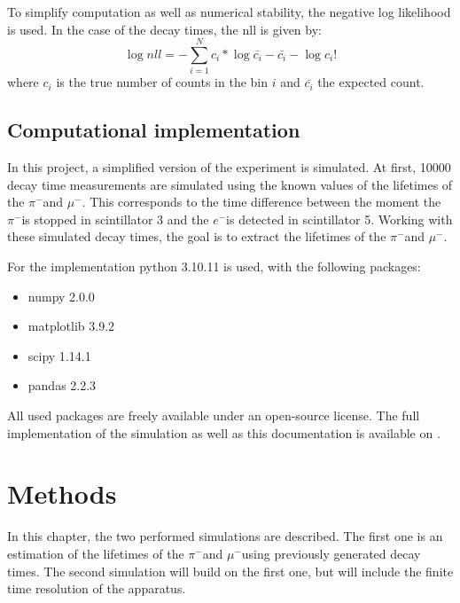 \documentclass[11pt, a4paper, oneside]{book}
\newcommand{\electron}{$e^{-}$}
\newcommand{\pion}{$\pi^{-}$}
\newcommand{\muon}{$\mu^{-}$}
\begin{document}
To simplify computation as well as numerical stability, the negative log likelihood is used. In the case of the decay times, the nll is given by:
\begin{equation}
  \log{nll} = -\sum_{i=1}^{N} c_i * \log{\bar{c_i}} - \bar{c_i} - \log{c_i!}
  \label{eq:likelihood}
\end{equation}
where $c_i$ is the true number of counts in the bin $i$ and $\bar{c_i}$ the expected count.

\section{Computational implementation}
In this project, a simplified version of the experiment is simulated. At first, \num{10000} decay time measurements are simulated using the known values of the lifetimes of the \pion and \muon. This corresponds to the time difference between the moment the \pion is stopped in scintillator 3 and the \electron is detected in scintillator 5. Working with these simulated decay times, the goal is to extract the lifetimes of the \pion and \muon.

For the implementation python 3.10.11 is used, with the following packages:
\begin{itemize}
    \item numpy 2.0.0
    \item matplotlib 3.9.2
    \item scipy 1.14.1
    \item pandas 2.2.3
\end{itemize}
All used packages are freely available under an open-source license. 
The full implementation of the simulation as well as this documentation is available on \cite{GitHub}.


\FloatBarrier
\chapter{Methods}
In this chapter, the two performed simulations are described. The first one is an estimation of the lifetimes of the \pion and \muon using previously generated decay times. The second simulation will build on the first one, but will include the finite time resolution of the apparatus. 
\end{document}
